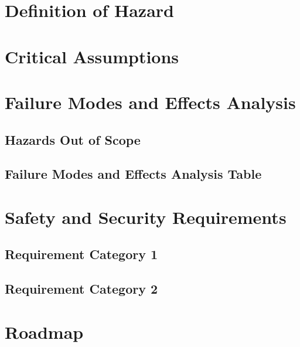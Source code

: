 \documentclass{article}
\begin{document}
\section{Definition of Hazard}

\section{Critical Assumptions}

\section{Failure Modes and Effects Analysis}

\subsection{Hazards Out of Scope}

\subsection{Failure Modes and Effects Analysis Table}

\section{Safety and Security Requirements}
\subsection{Requirement Category 1}
\subsection{Requirement Category 2}

\section{Roadmap}
\end{document}
